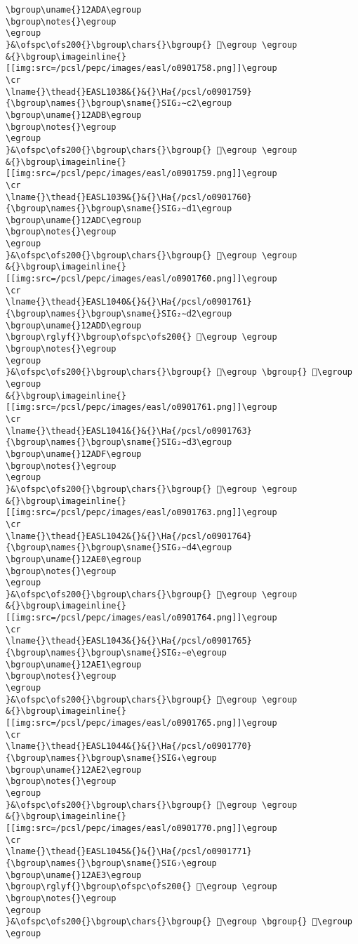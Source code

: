 \begin{verbatim}
\bgroup\uname{}12ADA\egroup
\bgroup\notes{}\egroup
\egroup
}&\ofspc\ofs200{}\bgroup\chars{}\bgroup{} 𒫚\egroup \egroup
&{}\bgroup\imageinline{}[[img:src=/pcsl/pepc/images/easl/o0901758.png]]\egroup
\cr
\lname{}\thead{}EASL1038&{}&{}\Ha{/pcsl/o0901759}{\bgroup\names{}\bgroup\sname{}SIG₂∼c2\egroup
\bgroup\uname{}12ADB\egroup
\bgroup\notes{}\egroup
\egroup
}&\ofspc\ofs200{}\bgroup\chars{}\bgroup{} 𒫛\egroup \egroup
&{}\bgroup\imageinline{}[[img:src=/pcsl/pepc/images/easl/o0901759.png]]\egroup
\cr
\lname{}\thead{}EASL1039&{}&{}\Ha{/pcsl/o0901760}{\bgroup\names{}\bgroup\sname{}SIG₂∼d1\egroup
\bgroup\uname{}12ADC\egroup
\bgroup\notes{}\egroup
\egroup
}&\ofspc\ofs200{}\bgroup\chars{}\bgroup{} 𒫜\egroup \egroup
&{}\bgroup\imageinline{}[[img:src=/pcsl/pepc/images/easl/o0901760.png]]\egroup
\cr
\lname{}\thead{}EASL1040&{}&{}\Ha{/pcsl/o0901761}{\bgroup\names{}\bgroup\sname{}SIG₂∼d2\egroup
\bgroup\uname{}12ADD\egroup
\bgroup\rglyf{}\bgroup\ofspc\ofs200{} 𒫝\egroup \egroup
\bgroup\notes{}\egroup
\egroup
}&\ofspc\ofs200{}\bgroup\chars{}\bgroup{} 𒫝\egroup \bgroup{} 𒫞\egroup \egroup
&{}\bgroup\imageinline{}[[img:src=/pcsl/pepc/images/easl/o0901761.png]]\egroup
\cr
\lname{}\thead{}EASL1041&{}&{}\Ha{/pcsl/o0901763}{\bgroup\names{}\bgroup\sname{}SIG₂∼d3\egroup
\bgroup\uname{}12ADF\egroup
\bgroup\notes{}\egroup
\egroup
}&\ofspc\ofs200{}\bgroup\chars{}\bgroup{} 𒫟\egroup \egroup
&{}\bgroup\imageinline{}[[img:src=/pcsl/pepc/images/easl/o0901763.png]]\egroup
\cr
\lname{}\thead{}EASL1042&{}&{}\Ha{/pcsl/o0901764}{\bgroup\names{}\bgroup\sname{}SIG₂∼d4\egroup
\bgroup\uname{}12AE0\egroup
\bgroup\notes{}\egroup
\egroup
}&\ofspc\ofs200{}\bgroup\chars{}\bgroup{} 𒫠\egroup \egroup
&{}\bgroup\imageinline{}[[img:src=/pcsl/pepc/images/easl/o0901764.png]]\egroup
\cr
\lname{}\thead{}EASL1043&{}&{}\Ha{/pcsl/o0901765}{\bgroup\names{}\bgroup\sname{}SIG₂∼e\egroup
\bgroup\uname{}12AE1\egroup
\bgroup\notes{}\egroup
\egroup
}&\ofspc\ofs200{}\bgroup\chars{}\bgroup{} 𒫡\egroup \egroup
&{}\bgroup\imageinline{}[[img:src=/pcsl/pepc/images/easl/o0901765.png]]\egroup
\cr
\lname{}\thead{}EASL1044&{}&{}\Ha{/pcsl/o0901770}{\bgroup\names{}\bgroup\sname{}SIG₄\egroup
\bgroup\uname{}12AE2\egroup
\bgroup\notes{}\egroup
\egroup
}&\ofspc\ofs200{}\bgroup\chars{}\bgroup{} 𒫢\egroup \egroup
&{}\bgroup\imageinline{}[[img:src=/pcsl/pepc/images/easl/o0901770.png]]\egroup
\cr
\lname{}\thead{}EASL1045&{}&{}\Ha{/pcsl/o0901771}{\bgroup\names{}\bgroup\sname{}SIG₇\egroup
\bgroup\uname{}12AE3\egroup
\bgroup\rglyf{}\bgroup\ofspc\ofs200{} 𒫣\egroup \egroup
\bgroup\notes{}\egroup
\egroup
}&\ofspc\ofs200{}\bgroup\chars{}\bgroup{} 𒫣\egroup \bgroup{} 𒫤\egroup \egroup

\end{verbatim}

